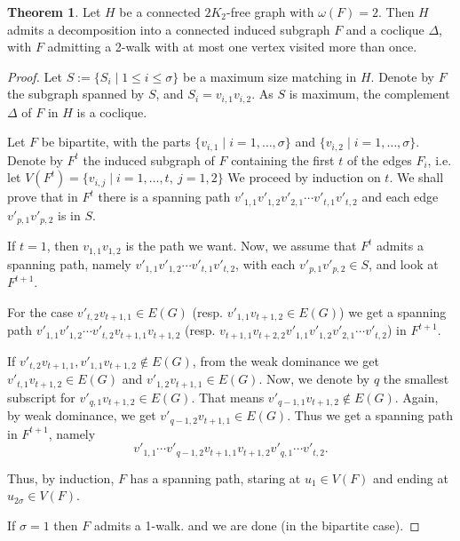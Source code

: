\documentclass{amsart}
\theoremstyle{definition}
\newtheorem{theorem}{Theorem}
\begin{document}
\begin{theorem}\label{thm4}
Let $H$ be a connected $2K_2$-free graph with $\omega(F)=2$. 
Then $H$ admits a decomposition into a connected induced subgraph $F$ and a coclique $\Delta$, with $F$ admitting a 2-walk
with at most one vertex visited more than once.
\end{theorem}


\begin{proof}
Let $S:=\{S_i\mid 1\leq i\leq  \sigma\}$ be a maximum size matching in $H$.
Denote by $F$ the subgraph spanned by $S$, and
$S_{i}=v_{i,1}v_{i,2}$. As $S$ is maximum, the complement $\Delta$ of $F$ in $H$
is a coclique.

Let $F$ be bipartite, with the parts $\{v_{i,1}\mid i=1,\ldots,\sigma\}$ and $\{v_{i,2}\mid i=1,\ldots,\sigma\}$. 
Denote by $F^t$ the induced subgraph of $F$ containing the first $t$ of the edges $F_i$, i.e. let $V(F^t)=\{v_{i,j}\mid i=1,\ldots,t, \ j=1,2\}$
We proceed by induction on $t$. We shall prove that in $F^t$ there is a spanning path $v'_{1,1}v'_{1,2}v'_{2,1}\cdots v'_{t,1}v'_{t,2}$ and each edge $v'_{p,1}v'_{p,2}$ is 
in $S$.

If $t=1$, then $v_{1,1}v_{1,2}$ is the path we want. Now, we assume that $F^t$ admits a spanning path, namely $v'_{1,1}v'_{1,2}\cdots v'_{t,1}v'_{t,2}$, 
with each $v'_{p,1}v'_{p,2}\in S$, and look at $F^{t+1}$.

For the case $v'_{t,2}v_{t+1,1}\in E(G)$ 
(resp. $v'_{1,1}v_{t+1,2}\in E(G)$)
we get a spanning path 
$v'_{1,1} v'_{1,2}\cdots v'_{t,2} v_{t+1,1} v_{t+1,2}$
(resp. $v_{t+1,1} v_{t+2,2} v'_{1,1} v'_{1,2} v'_{2,1}\cdots v'_{t,2}$)
in $F^{t+1}$.

If $v'_{t,2}v_{t+1,1},v'_{1,1}v_{t+1,2}\not\in E(G)$, from the weak dominance
we get $v'_{t,1}v_{t+1,2}\in E(G)$ and $v'_{1,2}v_{t+1,1}\in E(G)$. Now, we
denote by $q$ the smallest subscript for $v'_{q,1}v_{t+1,2}\in E(G)$. That
means $v'_{q-1,1}v_{t+1,2}\not\in E(G)$. Again, by weak dominance,
we get $v'_{q-1,2}v_{t+1,1}\in E(G)$. Thus we get a spanning path in
$F^{t+1}$, namely $$v'_{1,1}\cdots
v'_{q-1,2}v_{t+1,1}v_{t+1,2}v'_{q,1}\cdots v'_{t,2}.$$

Thus, by induction, $F$ has a spanning path, staring at $u_1\in V(F)$ and
ending at $u_{2\sigma}\in V(F)$. %

If $\sigma=1$ then $F$ admits a 1-walk.
and we are done (in the bipartite case).


\end{proof}
\end{document}
